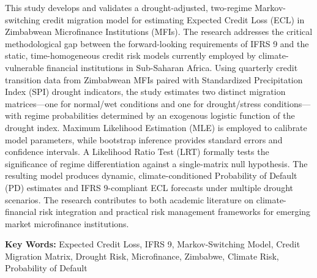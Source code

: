 \documentclass[12pt,a4paper]{article}
\begin{document}
\vspace{1cm}

This study develops and validates a drought-adjusted, two-regime Markov-switching credit migration model for estimating Expected Credit Loss (ECL) in Zimbabwean Microfinance Institutions (MFIs). The research addresses the critical methodological gap between the forward-looking requirements of IFRS 9 and the static, time-homogeneous credit risk models currently employed by climate-vulnerable financial institutions in Sub-Saharan Africa. Using quarterly credit transition data from Zimbabwean MFIs paired with Standardized Precipitation Index (SPI) drought indicators, the study estimates two distinct migration matrices---one for normal/wet conditions and one for drought/stress conditions---with regime probabilities determined by an exogenous logistic function of the drought index. Maximum Likelihood Estimation (MLE) is employed to calibrate model parameters, while bootstrap inference provides standard errors and confidence intervals. A Likelihood Ratio Test (LRT) formally tests the significance of regime differentiation against a single-matrix null hypothesis. The resulting model produces dynamic, climate-conditioned Probability of Default (PD) estimates and IFRS 9-compliant ECL forecasts under multiple drought scenarios. The research contributes to both academic literature on climate-financial risk integration and practical risk management frameworks for emerging market microfinance institutions.

\vspace{1cm}

\noindent\textbf{Key Words:} Expected Credit Loss, IFRS 9, Markov-Switching Model, Credit Migration Matrix, Drought Risk, Microfinance, Zimbabwe, Climate Risk, Probability of Default

\newpage

\setcounter{page}{1}

\end{document}
